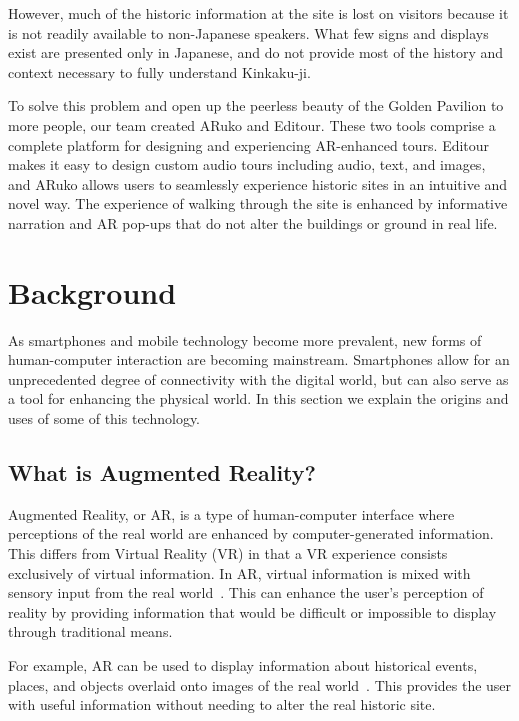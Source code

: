\documentclass[a4paper, 10pt, american, titlepage]{article}
\begin{document}
However, much of the historic information at the site is lost on visitors
because it is not readily available to non-Japanese speakers. What few signs and
displays exist are presented only in Japanese, and do not provide most of the
history and context necessary to fully understand Kinkaku-ji.

To solve this problem and open up the peerless beauty of the Golden Pavilion to
more people, our team created ARuko and Editour. These two tools comprise a
complete platform for designing and experiencing AR-enhanced tours. Editour
makes it easy to design custom audio tours including audio, text, and images,
and ARuko allows users to seamlessly experience historic sites in an intuitive
and novel way. The experience of walking through the site is enhanced by
informative narration and AR pop-ups that do not alter the buildings or ground
in real life.

\clearpage

\section{Background}
\label{sec:background}

As smartphones and mobile technology become more prevalent, new forms of
human-computer interaction are becoming mainstream. Smartphones allow for an
unprecedented degree of connectivity with the digital world, but can also serve
as a tool for enhancing the physical world. In this section we explain the
origins and uses of some of this technology.

\subsection{What is Augmented Reality?}
\label{sec:whatIsAugmentedReality}

Augmented Reality, or AR, is a type of human-computer interface where
perceptions of the real world are enhanced by computer-generated information.
This differs from Virtual Reality (VR) in that a VR experience consists
exclusively of virtual information. In AR, virtual information is mixed with
sensory input from the real world~\autocite{carmigniani2011}. This can enhance
the user's perception of reality by providing information that would be
difficult or impossible to display through traditional means.

For example, AR can be used to display information about historical events,
places, and objects overlaid onto images of the real
world~\autocite{saenz2009}.  This provides the user with useful information
without needing to alter the real historic site.
\end{document}
